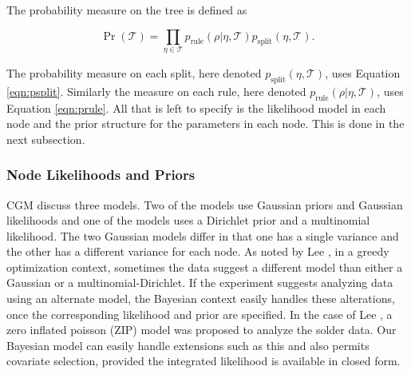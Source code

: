  The probability measure on the tree is defined as 
 
 \begin{equation}
 \Pr(\mathcal{T}) = \prod_{\eta \in \mathcal{T}} p_{\text{rule}}(\rho \vert \eta, \mathcal{T})p_{\text{split}}(\eta, \mathcal{T}).
\end{equation}

The probability measure on each split, here denoted $p_{\text{split}}(\eta, \mathcal{T})$, uses Equation \ref{eqn:psplit}. Similarly the measure on each rule, here denoted $p_{\text{rule}}(\rho \vert \eta, \mathcal{T})$, uses Equation \ref{eqn:prule}. 
All that is left to specify is the likelihood model in each node and the prior structure for the parameters in each node. This is done in the next subsection. 

\subsubsection{Node Likelihoods and Priors}

CGM discuss three models. Two of the models use Gaussian priors and Gaussian likelihoods and one of the models uses a Dirichlet prior and a multinomial likelihood. The two Gaussian models differ in that one has a single variance and the other has a different variance for each node. As noted by Lee \cite{lee2006decision}, in a greedy optimization context, sometimes the data suggest a different model than either a Gaussian or a multinomial-Dirichlet. If the experiment suggests analyzing data using an alternate model, the Bayesian context easily handles these alterations, once the corresponding likelihood and prior are specified. In the case of Lee \cite{lee2006decision}, a zero inflated poisson (ZIP) model was proposed to analyze the solder data. Our Bayesian model can easily handle extensions such as this and also permits covariate selection, provided the integrated likelihood is available in closed form.


